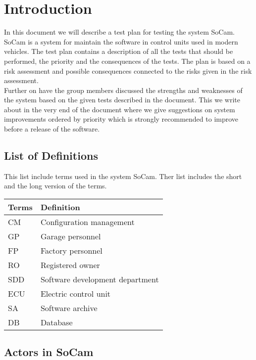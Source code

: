 \chapter{Introduction}

	In this document we will describe a test plan for testing the system SoCam. SoCam is a system for maintain the software in control units used in modern vehicles. The test plan contains a description of all the tests that should be performed, the priority and the consequences of the tests. The plan is based on a risk assessment and possible consequences connected to the risks given in the risk assessment.\\

Further on have the group members discussed the strengths and weaknesses of the system based on the given tests described in the document. This we write about in the very end of the document where we give suggestions on system improvements ordered by priority which is strongly recommended to improve before a release of the software.

	\clearpage
	\section{List of Definitions}

	This list include terms used in the system SoCam. Ther list includes
	the short and the long version of the terms. 

		\begin{table}[H]
			\begin{tabular}{ p{3cm} | p{8cm} }
				\hline
				\rowcolor{gray}
				{\bf Terms} & {\bf Definition} \\ \hline
					CM & Configuration management \\ \hline
					GP & Garage personnel \\ \hline
					FP & Factory personnel \\ \hline
					RO & Registered owner \\ \hline
					SDD & Software development department \\ \hline
					ECU & Electric control unit \\ \hline
					SA & Software archive \\ \hline
					DB & Database \\ \hline
				\end{tabular}
		\end{table}

	\section{Actors in SoCam}

